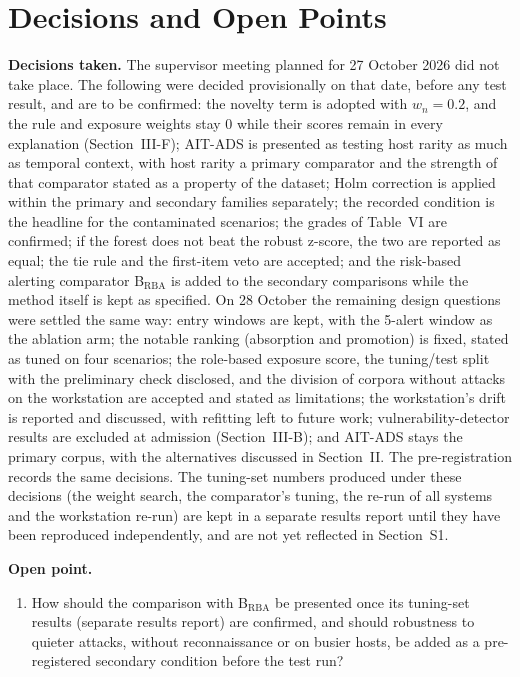 \documentclass[conference]{IEEEtran}
\begin{document}
\section{Decisions and Open Points}
\label{sec:open}

\textbf{Decisions taken.} The supervisor meeting planned for 27 October 2026 did not take place. The following were decided provisionally on that date, before any test result, and are to be confirmed: the novelty term is adopted with $w_n = 0.2$, and the rule and exposure weights stay 0 while their scores remain in every explanation (Section~III-F); AIT-ADS is presented as testing host rarity as much as temporal context, with host rarity a primary comparator and the strength of that comparator stated as a property of the dataset; Holm correction is applied within the primary and secondary families separately; the recorded condition is the headline for the contaminated scenarios; the grades of Table~VI are confirmed; if the forest does not beat the robust z-score, the two are reported as equal; the tie rule and the first-item veto are accepted; and the risk-based alerting comparator B$_\mathrm{RBA}$ is added to the secondary comparisons while the method itself is kept as specified. On 28 October the remaining design questions were settled the same way: entry windows are kept, with the 5-alert window as the ablation arm; the notable ranking (absorption and promotion) is fixed, stated as tuned on four scenarios; the role-based exposure score, the tuning/test split with the preliminary check disclosed, and the division of corpora without attacks on the workstation are accepted and stated as limitations; the workstation's drift is reported and discussed, with refitting left to future work; vulnerability-detector results are excluded at admission (Section~III-B); and AIT-ADS stays the primary corpus, with the alternatives discussed in Section~II. The pre-registration records the same decisions. The tuning-set numbers produced under these decisions (the weight search, the comparator's tuning, the re-run of all systems and the workstation re-run) are kept in a separate results report until they have been reproduced independently, and are not yet reflected in Section~S1.

\textbf{Open point.}
\begin{enumerate}
\item How should the comparison with B$_\mathrm{RBA}$ be presented once its tuning-set results (separate results report) are confirmed, and should robustness to quieter attacks, without reconnaissance or on busier hosts, be added as a pre-registered secondary condition before the test run?
\end{enumerate}
\end{document}
